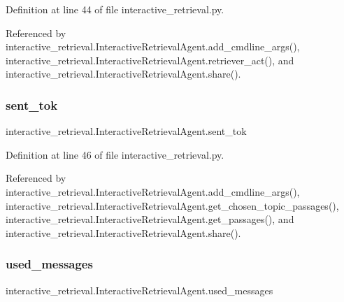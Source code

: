 Definition at line 44 of file interactive\+\_\+retrieval.\+py.



Referenced by interactive\+\_\+retrieval.\+Interactive\+Retrieval\+Agent.\+add\+\_\+cmdline\+\_\+args(), interactive\+\_\+retrieval.\+Interactive\+Retrieval\+Agent.\+retriever\+\_\+act(), and interactive\+\_\+retrieval.\+Interactive\+Retrieval\+Agent.\+share().

\mbox{\label{classinteractive__retrieval_1_1InteractiveRetrievalAgent_ad5589ceb946df4efce9ef934973022e7}} 
\subsubsection{\texorpdfstring{sent\+\_\+tok}{sent\_tok}}
{\footnotesize\ttfamily interactive\+\_\+retrieval.\+Interactive\+Retrieval\+Agent.\+sent\+\_\+tok}



Definition at line 46 of file interactive\+\_\+retrieval.\+py.



Referenced by interactive\+\_\+retrieval.\+Interactive\+Retrieval\+Agent.\+add\+\_\+cmdline\+\_\+args(), interactive\+\_\+retrieval.\+Interactive\+Retrieval\+Agent.\+get\+\_\+chosen\+\_\+topic\+\_\+passages(), interactive\+\_\+retrieval.\+Interactive\+Retrieval\+Agent.\+get\+\_\+passages(), and interactive\+\_\+retrieval.\+Interactive\+Retrieval\+Agent.\+share().

\mbox{\label{classinteractive__retrieval_1_1InteractiveRetrievalAgent_ae72aa4004665f34696ba66765d369fcd}} 
\subsubsection{\texorpdfstring{used\+\_\+messages}{used\_messages}}
{\footnotesize\ttfamily interactive\+\_\+retrieval.\+Interactive\+Retrieval\+Agent.\+used\+\_\+messages}



